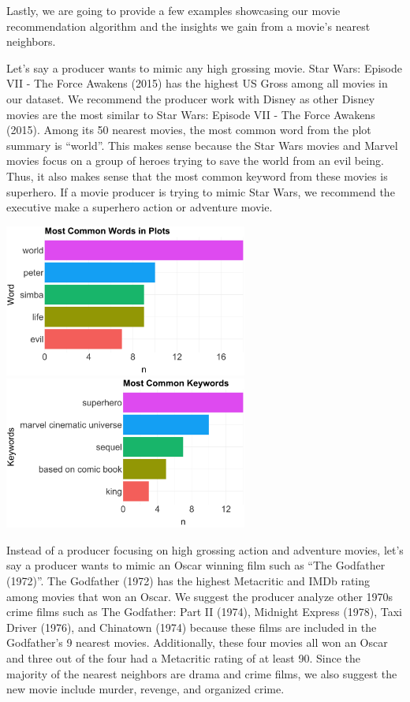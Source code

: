 \documentclass[10pt]{article}
\begin{document}
Lastly, we are going to provide a few examples showcasing our movie recommendation algorithm and the insights we gain from a movie’s nearest neighbors.  

Let’s say a producer wants to mimic any high grossing movie. Star Wars: Episode VII - The Force Awakens (2015) has the highest US Gross among all movies in our dataset. We recommend the producer work with Disney as other Disney movies are the most similar to Star Wars: Episode VII - The Force Awakens (2015). Among its 50 nearest movies, the most common word from the plot summary is “world”. This makes sense because the Star Wars movies and Marvel movies focus on a group of heroes trying to save the world from an evil being. Thus, it also makes sense that the most common keyword from these movies is superhero. If a movie producer is trying to mimic Star Wars, we recommend the executive make a superhero action or adventure movie. 

\begin{center}
\includegraphics[width=8cm]{_assets/_assets_knn/star_wars_common_words.png}
\hspace{1cm}
\includegraphics[width=8cm]{_assets/_assets_knn/star_wars_common_keywords.png}

\end{center}

Instead of a producer focusing on high grossing action and adventure movies, let’s say a producer wants to mimic an Oscar winning film such as “The Godfather (1972)”. The Godfather (1972) has the highest Metacritic and IMDb rating among movies that won an Oscar. We suggest the producer analyze other 1970s crime films such as The Godfather: Part II (1974), Midnight Express (1978), Taxi Driver (1976), and Chinatown (1974) because these films are included in the Godfather’s 9 nearest movies. Additionally, these four movies all won an Oscar and three out of the four had a Metacritic rating of at least 90. Since the majority of the nearest neighbors are drama and crime films, we also suggest the new movie include murder, revenge, and organized crime.
\end{document}
